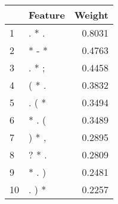 \begin{tabular}{llr}
\toprule
{} & Feature &  Weight \\
\midrule
1  &   . * . &  0.8031 \\
2  &   * - * &  0.4763 \\
3  &   . * ; &  0.4458 \\
4  &   ( * . &  0.3832 \\
5  &   . ( * &  0.3494 \\
6  &   * . ( &  0.3489 \\
7  &   ) * , &  0.2895 \\
8  &   ? * . &  0.2809 \\
9  &   * . ) &  0.2481 \\
10 &   . ) * &  0.2257 \\
\bottomrule
\end{tabular}
